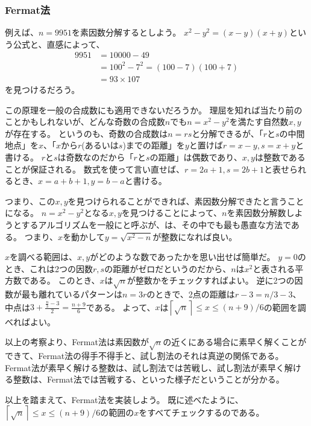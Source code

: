 \subsubsection{Fermat法}
\label{sssec:fermat_method}
例えば、$n=9951$を素因数分解するとしよう。
$x^2-y^2 = (x-y)(x+y)$という公式と、直感によって、
\begin{align*}
9951 &= 10000 - 49\\
&= 100^2 - 7^2 = (100 - 7)(100 + 7)\\
&= 93 \times 107
\end{align*}
を見つけるだろう。

この原理を一般の合成数にも適用できないだろうか。
理屈を知れば当たり前のことかもしれないが、どんな奇数の合成数$n$でも$n=x^2-y^2$を満たす自然数$x,y$が存在する。
というのも、奇数の合成数は$n=rs$と分解できるが、「$r$と$s$の中間地点」を$x$、「$x$から$r$(あるいは$s$)までの距離」を$y$と置けば$r=x-y,s=x+y$と書ける。
$r$と$s$は奇数なのだから「$r$と$s$の距離」は偶数であり、$x,y$は整数であることが保証される。
数式を使って言い直せば、$r=2a+1,s=2b+1$と表せられるとき、$x=a+b+1,y=b-a$と書ける。

つまり、この$x,y$を見つけられることができれば、素因数分解できたと言うことになる。
$n=x^2-y^2$となる$x,y$を見つけることによって、$n$を素因数分解数しようとするアルゴリズムを一般にと呼ぶが、は、その中でも最も愚直な方法である。
つまり、$x$を動かして$y=\sqrt{x^2-n}$が整数になれば良い。

$x$を調べる範囲は、$x,y$がどのような数であったかを思い出せば簡単だ。
$y=0$のとき、これは2つの因数$r,s$の距離がゼロだというのだから、$n$は$x^2$と表される平方数である。
このとき、$x$は$\sqrt{n}$が整数かをチェックすればよい。
逆に2つの因数が最も離れているパターンは$n=3r$のときで、2点の距離は$r-3=n/3-3$、中点は$3+\frac{\frac{n}{3}-3}{2}=\frac{n+9}{6}$である。
よって、$x$は$\left \lceil\sqrt{n}\right \rceil\le x \le (n + 9) / 6$の範囲を調べればよい。

以上の考察より、Fermat法は素因数が$\sqrt{n}$の近くにある場合に素早く解くことができて、Fermat法の得手不得手と、試し割法のそれは真逆の関係である。
Fermat法が素早く解ける整数は、試し割法では苦戦し、試し割法が素早く解ける整数は、Fermat法では苦戦する、といった様子だということが分かる。

以上を踏まえて、Fermat法を実装しよう。
既に述べたように、$\left \lceil\sqrt{n}\right \rceil \le x \le (n + 9) / 6$の範囲の$x$をすべてチェックするのである。


